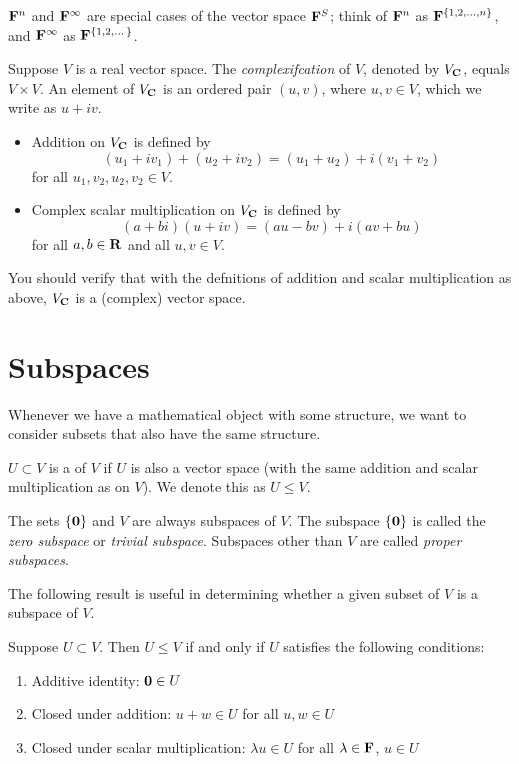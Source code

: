 \begin{remark}
$\mathbf F^n$ and $\mathbf F^\infty$ are special cases of the vector space $\mathbf F^S$; think of $\mathbf F^n$ as $\mathbf F^{\{1,2,\dots,n\}}$, and $\mathbf F^\infty$ as $\mathbf F^{\{1,2,\dots\}}$.
\end{remark}

\begin{example}[Complexification]
Suppose $V$ is a real vector space. The \emph{complexifcation} of $V$, denoted by $V_\mathbf C$, equals $V\times V$. An element of $V_\mathbf C$ is an ordered pair $(u,v)$, where $u,v\in V$, which we write as $u+iv$.
\begin{itemize}
\item Addition on $V_\mathbf C$ is defined by
\[(u_1+iv_1)+(u_2+iv_2)=(u_1+u_2)+i(v_1+v_2)\]
for all $u_1,v_2,u_2,v_2\in V$.
\item Complex scalar multiplication on $V_\mathbf C$ is defined by
\[(a+bi)(u+iv)=(au-bv)+i(av+bu)\]
for all $a,b\in\mathbf R$ and all $u,v\in V$.
\end{itemize}
You should verify that with the defnitions of addition and scalar multiplication as above, $V_\mathbf C$ is a (complex) vector space.
\end{example}

\section{Subspaces}
Whenever we have a mathematical object with some structure, we want to consider subsets that also have the same structure.

\begin{definition}[Subspace]
$U\subset V$ is a  of $V$ if $U$ is also a vector space (with the same addition and scalar multiplication as on $V$). We denote this as $U\le V$.
\end{definition}

The sets $\{\vb{0}\}$ and $V$ are always subspaces of $V$. The subspace $\{\vb{0}\}$ is called the \emph{zero subspace} or \emph{trivial subspace}. Subspaces other than $V$ are called \emph{proper subspaces}.

The following result is useful in determining whether a given subset of $V$ is a subspace of $V$.

\begin{lemma}\label{lemma:subspace-conditions}
Suppose $U\subset V$. Then $U\le V$ if and only if $U$ satisfies the following conditions:
\begin{enumerate}[label=(\roman*)]
\item Additive identity: $\vb{0}\in U$
\item Closed under addition: $u+w\in U$ for all $u,w\in U$
\item Closed under scalar multiplication: $\lambda u\in U$ for all $\lambda\in\mathbf F$, $u\in U$
\end{enumerate}
\end{lemma}

